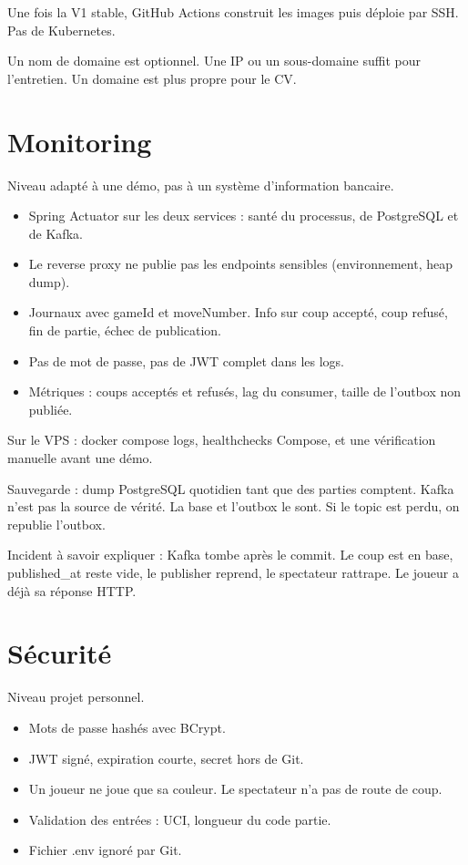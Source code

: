 \documentclass[11pt,a4paper]{article}
\newcommand{\field}[1]{{\ttfamily #1}}
\begin{document}
Une fois la V1 stable, GitHub Actions construit les images puis déploie par SSH. Pas de Kubernetes.

Un nom de domaine est optionnel. Une IP ou un sous-domaine suffit pour l'entretien. Un domaine est plus propre pour le CV.

\section{Monitoring}

Niveau adapté à une démo, pas à un système d'information bancaire.

\begin{itemize}
  \item Spring Actuator sur les deux services : santé du processus, de PostgreSQL et de Kafka.
  \item Le reverse proxy ne publie pas les endpoints sensibles (environnement, heap dump).
  \item Journaux avec \field{gameId} et \field{moveNumber}. Info sur coup accepté, coup refusé, fin de partie, échec de publication.
  \item Pas de mot de passe, pas de JWT complet dans les logs.
  \item Métriques : coups acceptés et refusés, lag du consumer, taille de l'outbox non publiée.
\end{itemize}

Sur le VPS : \field{docker compose logs}, healthchecks Compose, et une vérification manuelle avant une démo.

Sauvegarde : dump PostgreSQL quotidien tant que des parties comptent. Kafka n'est pas la source de vérité. La base et l'outbox le sont. Si le topic est perdu, on republie l'outbox.

Incident à savoir expliquer : Kafka tombe après le commit. Le coup est en base, \field{published\_at} reste vide, le publisher reprend, le spectateur rattrape. Le joueur a déjà sa réponse HTTP.

\section{Sécurité}

Niveau projet personnel.

\begin{itemize}
  \item Mots de passe hashés avec BCrypt.
  \item JWT signé, expiration courte, secret hors de Git.
  \item Un joueur ne joue que sa couleur. Le spectateur n'a pas de route de coup.
  \item Validation des entrées : UCI, longueur du code partie.
  \item Fichier \field{.env} ignoré par Git.
\end{itemize}
\end{document}
